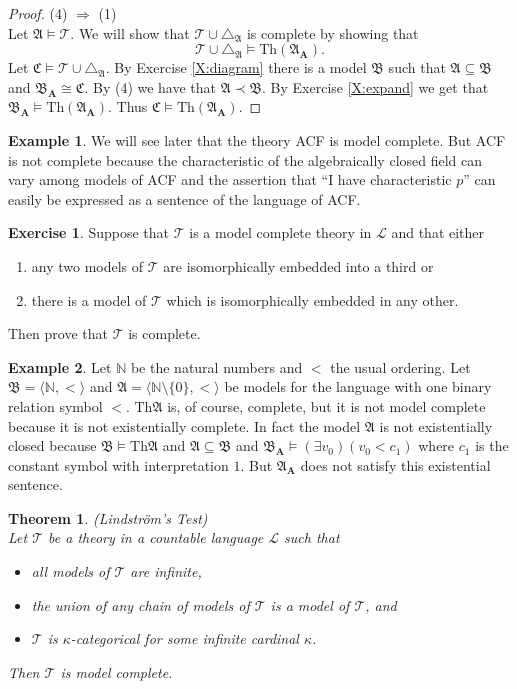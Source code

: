 \documentclass[titlepage, oneside]{amsbook}
\theoremstyle{plain}
\newtheorem{theorem}{Theorem}
\theoremstyle{definition}
\newtheorem{exercise}{Exercise}
\newtheorem{examples}{Example}
\theoremstyle{remark}
\newcommand{\Th}{\ensuremath{\mbox{Th}}}
\newcommand{\tria}[1]{\ensuremath{\triangle_{\mathfrak{#1}}}}
\newcommand{\theory}{\ensuremath{\mathcal{T}}}
\newcommand{\lan}{\ensuremath{\mathcal{L}}}
\newcommand{\seq}{\ensuremath{\subseteq}}
\newcommand{\ma}{\ensuremath{\mathfrak{A}}}
\newcommand{\mb}{\ensuremath{\mathfrak{B}}}
\newcommand{\mc}{\ensuremath{\mathfrak{C}}}
\newcommand{\ba}{\ensuremath{\mathbf{A}}}
\begin{document}
\begin{proof}
 (4) $\Rightarrow$ (1) \\
Let $\ma \models \theory$. We will show that $\theory \cup \tria A$ is
complete by showing that 
\[
        \theory \cup \tria A \models \Th (\ma_\ba).
\]
Let $\mc \models \theory \cup \tria A$. By Exercise \ref{X:diagram} there is a model $\mb$ such that $\ma \subseteq \mb$ and $\mb_\ba \cong \mc$. By (4) we have that $\ma \prec \mb$. 
By Exercise \ref{X:expand} we get that $\mb_\ba \models \Th (\ma_\ba)$. Thus 
$\mc \models \Th (\ma_\ba)$.
\end{proof}

\begin{examples} We will see later that the theory ACF is model complete. 
But ACF is not complete because the characteristic of the algebraically
closed field can vary among models of ACF and the assertion that ``I
have characteristic $p$'' can easily be expressed as a sentence of the
language of ACF. 
\end{examples}

\begin{exercise}\label{E:m.c.impliesc.} Suppose that $\theory$ is a 
model complete theory in $\lan$ and that either 
\begin{enumerate}
\item any two models of $\theory$ are isomorphically embedded into a
third or
\item there is a model of $\theory$ which is isomorphically embedded in
any other.
\end{enumerate}
Then prove that $\theory$ is complete.

\end{exercise}


\begin{examples}  Let $\mathbb N$ be the natural numbers and $<$ the
usual ordering.  Let $\mb = \langle \mathbb N , < \rangle$ and $\ma =
\langle \mathbb N \setminus \{ 0 \} , <\rangle$ be models for the language
with one binary relation symbol $<$.  $\Th \ma$ is, of course,
complete, but it is not model complete because it is not existentially
complete.
In fact the model $\ma$ is not existentially closed because $\mb \models
\Th \ma$ and $\ma \seq \mb$ and $\mb_\ba \models ( \exists v_0 ) (v_0 <
c_1 )$ where $c_1$ is the constant symbol with interpretation $1$.  But
$\ma_\ba$ does not satisfy this existential sentence.
\end{examples}


\begin{theorem} (Lindstr\"{o}m's Test)\\
%
Let $\theory$ be a theory in a countable language $\lan$ such that 
\begin{itemize}
\item[(1)] all models of $\theory$ are infinite,
\item[(2)] the union of any chain of models of $\theory$ is a model of
$\theory$, and 
\item[(3)] $\theory$ is $\kappa$-categorical for some infinite cardinal
$\kappa$.
\end{itemize}
Then $\theory$ is model complete.
\end{theorem}
\end{document}
